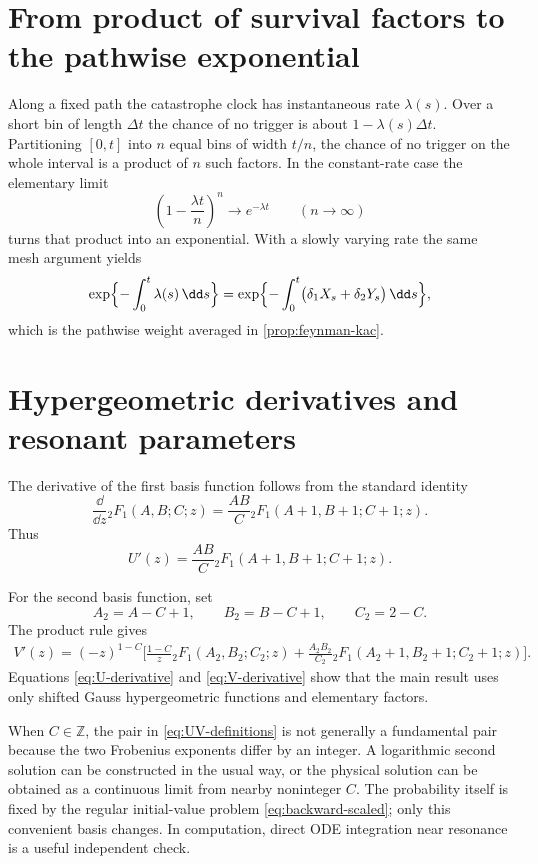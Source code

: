 \appendix

\section{From product of survival factors to the pathwise exponential}
\label{app:product-to-exponential}

Along a fixed path the catastrophe clock has instantaneous rate $\lambda(s)$. Over a short bin of length $\Delta t$ the chance of no trigger is about $1-\lambda(s)\Delta t$. Partitioning $[0,t]$ into $n$ equal bins of width $t/n$, the chance of no trigger on the whole interval is a product of $n$ such factors. In the constant-rate case the elementary limit
\[
\left(1-\frac{\lambda t}{n}\right)^{n}\longrightarrow e^{-\lambda t}
\qquad(n\to\infty)
\]
turns that product into an exponential. With a slowly varying rate the same mesh argument yields
\[
\exp\Bigl\{-\int_0^t\lambda(s)\,\dd s\Bigr\}
=\exp\Bigl\{-\int_0^t\bigl(\delta_1X_s+\delta_2Y_s\bigr)\,\dd s\Bigr\},
\]
which is the pathwise weight averaged in \cref{prop:feynman-kac}.

\section{Hypergeometric derivatives and resonant parameters}
\label{app:hypergeometric-details}

The derivative of the first basis function follows from the standard identity
\[
\frac{\dd}{\dd z}{}_2F_1(A,B;C;z)
=\frac{AB}{C}{}_2F_1(A+1,B+1;C+1;z).
\]
Thus
\begin{equation}
\label{eq:U-derivative}
U'(z)=\frac{AB}{C}
{}_2F_1(A+1,B+1;C+1;z).
\end{equation}

For the second basis function, set
\begin{equation*}
A_2=A-C+1,
\qquad
B_2=B-C+1,
\qquad
C_2=2-C.
\end{equation*}
The product rule gives
\begin{equation}
\label{eq:V-derivative}
\begin{aligned}
V'(z)=(-z)^{1-C}\Biggl[
\frac{1-C}{z}{}_2F_1(A_2,B_2;C_2;z)
+\frac{A_2B_2}{C_2}
{}_2F_1(A_2+1,B_2+1;C_2+1;z)
\Biggr].
\end{aligned}
\end{equation}
Equations \eqref{eq:U-derivative} and \eqref{eq:V-derivative} show that the main result uses only shifted Gauss hypergeometric functions and elementary factors.

When $C\in\mathbb Z$, the pair in \cref{eq:UV-definitions} is not generally a fundamental pair because the two Frobenius exponents differ by an integer. A logarithmic second solution can be constructed in the usual way, or the physical solution can be obtained as a continuous limit from nearby noninteger $C$. The probability itself is fixed by the regular initial-value problem \cref{eq:backward-scaled}; only this convenient basis changes. In computation, direct ODE integration near resonance is a useful independent check.

